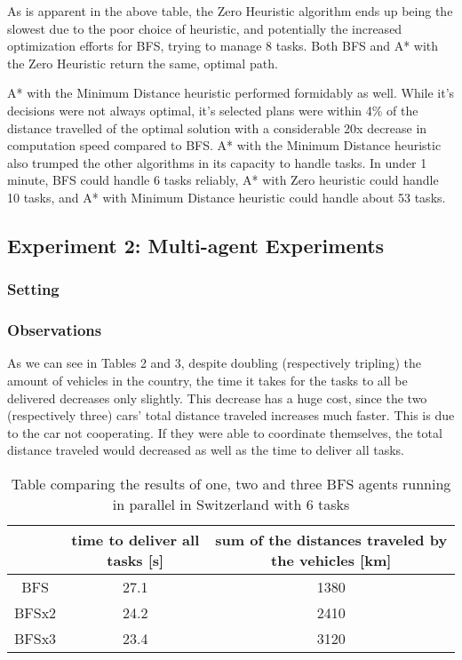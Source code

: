 \documentclass[11pt]{article}
\begin{document}
As is apparent in the above table, the Zero Heuristic algorithm ends up being the slowest due to the poor choice of heuristic, and potentially the increased optimization efforts for BFS, trying to manage 8 tasks. Both BFS and A* with the Zero Heuristic return the same, optimal path. 

A* with the Minimum Distance heuristic performed formidably as well. While it's decisions were not always optimal, it's selected plans were within 4\% of the distance travelled of the optimal solution with a considerable 20x decrease in computation speed compared to BFS. A* with the Minimum Distance heuristic also trumped the other algorithms in its capacity to handle tasks. In under 1 minute, BFS could handle 6 tasks reliably, A* with Zero heuristic could handle 10 tasks, and A* with Minimum Distance heuristic could handle about 53 tasks. 

\subsection{Experiment 2: Multi-agent Experiments}

\subsubsection{Setting}

\subsubsection{Observations}
As we can see in Tables 2 and 3, despite doubling (respectively tripling) the amount of vehicles in the country, the time it takes for the tasks to all be delivered decreases only slightly. This decrease has a huge cost, since the two (respectively three) cars' total distance traveled increases much faster. This is due to the car not cooperating. If they were able to coordinate themselves, the total distance traveled would decreased as well as the time to deliver all tasks.\\

\begin{table}[h]
	\centering
	\begin{tabular}{ | c | c | c | } 
		\hline
		\qquad & time to deliver all tasks [s] & sum of the distances traveled by the vehicles [km]\\
		\hline
		BFS & 27.1 & 1380 \\ 
		\hline
		BFSx2 & 24.2 & 2410 \\
		\hline
		BFSx3 & 23.4 & 3120 \\
		\hline
	\end{tabular}
	\caption{Table comparing the results of one, two and three BFS agents running in parallel in Switzerland with 6 tasks}
	\label{table:2}
\end{table}
\end{document}

